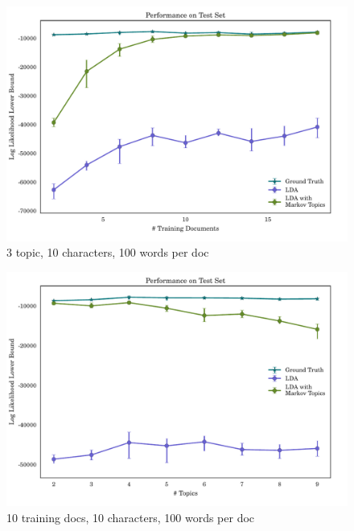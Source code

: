 \documentclass[10pt]{article}
\begin{document}
\begin{figure}[h!]
\begin{centering}
    \includegraphics[width=1.0\textwidth]{./markov_model_medium_likelihood_vs_n_train}
\par\end{centering}
\caption{3 topic, 10 characters, 100 words per doc \label{fig:results}}
\end{figure}
\begin{figure}[h!]
\begin{centering}
    \includegraphics[width=1.0\textwidth]{./markov_model_medium_likelihood_vs_n_topics}
\par\end{centering}
\caption{10 training docs, 10 characters, 100 words per doc \label{fig:results1}}
\end{figure}




\end{document}
